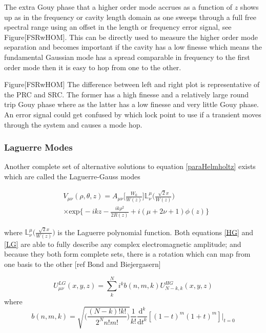 		The extra Gouy phase that a higher order mode accrues as a function of $z$ shows up as in the frequency or cavity length domain as one sweeps through a full free spectral range using an offset in the length or frequency error signal, see Figure[FSRwHOM].  This  can be directly used to measure the higher order mode separation and becomes important if the cavity has a low finesse which means the fundamental Gaussian mode has a spread comparable in frequency to the first order mode then it is easy to hop from one to the other.
			
		Figure[FSRwHOM] The difference between left and right plot is representative of the PRC and SRC.  The former has a high finesse and a relatively large round trip Gouy phase where as the latter has a low finesse and very little Gouy phase.  An error signal could get confused by which lock point to use if a transient moves through the system and causes a mode hop.
		
		\subsubsection{Laguerre Modes}
		Another complete set of alternative solutions to equation \ref{paraHelmholtz} exists which are called the Laguerre-Gauss modes
		
		\begin{equation}\label{LG}
		\begin{aligned}
		&V_{\mu\nu}(\rho,\theta,z) = A_{\mu\nu}\bigg[ \frac{W_0}{W(z)} \bigg] \mathbb{L}^{\mu}_{\nu} \Bigg( \frac{\sqrt{2}x}{W(z)}  \Bigg) \\
		&\times \text{exp} \bigg\{-ikz-\frac{ik\rho^2}{2R(z)} + i(\mu+2\nu+1)\phi(z) \bigg\}
		\end{aligned}
		\end{equation}
		
		where $\mathbb{L}^{\mu}_{\nu} \Bigg( \frac{\sqrt{2}x}{W(z)}  \Bigg)$ is the Laguerre polynomial function. Both equations \ref{HG} and \ref{LG} are able to fully describe any complex electromagnetic amplitude; and because they both form complete sets, there is a rotation which can map from one basis to the other [ref Bond and Biejergasern]
		
		\begin{equation}
		U^{LG}_{\mu \nu} (x,y,z) = \sum\limits_{k}^{N} i^k b(n,m,k) U^{HG}_{N-k,k} (x,y,z)
		\end{equation}
		where
		\begin{equation}
		b(n,m,k) = \sqrt{\bigg( \frac{(N-k)!k!}{2^N n!m!} \bigg)} \frac{1}{k!} \frac{\text{d}^k}{\text{d}t^k}[(1-t)^m (1+t)^m]\vert_{t=0}
		\end{equation}

